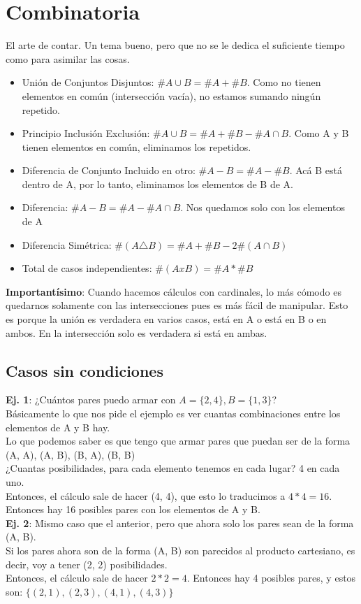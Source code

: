 \documentclass[10pt,a4paper]{article}
\begin{document}
\section*{Combinatoria}
El arte de contar. Un tema bueno, pero que no se le dedica el suficiente tiempo como para asimilar las cosas.
\begin{itemize}
    \item Unión de Conjuntos Disjuntos: $\#A\cup B = \#A + \#B $. Como no tienen elementos en común (intersección vacía), no estamos sumando ningún repetido. 
    \item Principio Inclusión Exclusión: $\#A\cup B = \#A + \#B - \#A\cap B  $. Como A y B tienen elementos en común, eliminamos los repetidos.
    \item Diferencia de Conjunto Incluido en otro: $\#A-B = \#A-\#B$. Acá B está dentro de A, por lo tanto, eliminamos los elementos de B de A.
    \item Diferencia: $\#A-B = \#A - \#A\cap B$. Nos quedamos solo con los elementos de A
    \item Diferencia Simétrica: $\#(A\triangle B) = \#A + \#B - 2\#(A \cap B)$
    \item Total de casos independientes: $\#(AxB) = \#A \ast \#B $ 
\end{itemize}
\textbf{Importantísimo}: Cuando hacemos cálculos con cardinales, lo más cómodo es quedarnos solamente con las intersecciones pues es más fácil de manipular. Esto es porque la unión es verdadera en varios casos, está en A o está en B o en ambos. En la intersección solo es verdadera si está en ambas.
\subsection*{Casos sin condiciones}
\textbf{Ej. 1}: ¿Cuántos pares puedo armar con $ A = \{2, 4\}, B = \{1, 3\}$? \\
Básicamente lo que nos pide el ejemplo es ver cuantas combinaciones entre los elementos de A y B hay. \\
Lo que podemos saber es que tengo que armar pares que puedan ser de la forma (A, A), (A, B), (B, A), (B, B) \\
¿Cuantas posibilidades, para cada elemento tenemos en cada lugar? 4 en cada uno. \\
Entonces, el cálculo sale de hacer (4, 4), que esto lo traducimos a $ 4 \ast 4 = 16$. Entonces hay 16 posibles pares con los elementos de A y B. \\

\textbf{Ej. 2}: Mismo caso que el anterior, pero que ahora solo los pares sean de la forma (A, B). \\
Si los pares ahora son de la forma (A, B) son parecidos al producto cartesiano, es decir, voy a tener (2, 2) posibilidades. \\
Entonces, el cálculo sale de hacer $2 \ast 2 = 4$. Entonces hay 4 posibles pares, y estos son: $\{(2, 1), (2, 3), (4, 1), (4, 3)\}$ \\
\end{document}

